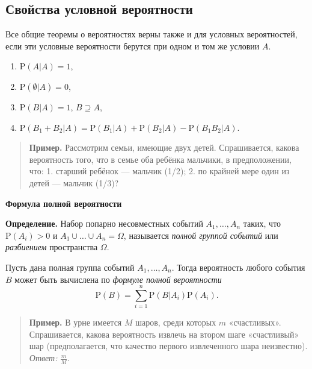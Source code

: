 \documentclass[11pt,a4paper]{article}
\providecommand{\tightlist}{%
      \setlength{\itemsep}{0pt}\setlength{\parskip}{0pt}}
\begin{document}
    \hypertarget{ux441ux432ux43eux439ux441ux442ux432ux430-ux443ux441ux43bux43eux432ux43dux43eux439-ux432ux435ux440ux43eux44fux442ux43dux43eux441ux442ux438}{%
\subsection{Свойства условной
вероятности}\label{ux441ux432ux43eux439ux441ux442ux432ux430-ux443ux441ux43bux43eux432ux43dux43eux439-ux432ux435ux440ux43eux44fux442ux43dux43eux441ux442ux438}}

Все общие теоремы о вероятностях верны также и для условных
вероятностей, если эти условные вероятности берутся при одном и том же
условии \(A\).

\begin{enumerate}
\def\labelenumi{\arabic{enumi}.}
\tightlist
\item
  \(\mathrm{P}(A|A) = 1\),
\item
  \(\mathrm{P}(\emptyset|A) = 0\),
\item
  \(\mathrm{P}(B|A) = 1\), \(B \supseteq A\),
\item
  \(\mathrm{P}(B_1 + B_2|A) = \mathrm{P}(B_1|A) + \mathrm{P}(B_2|A) - \mathrm{P}(B_1 B_2|A)\).
\end{enumerate}

\begin{quote}
\textbf{Пример.} Рассмотрим семьи, имеющие двух детей. Спрашивается,
какова вероятность того, что в семье оба ребёнка мальчики, в
предположении, что: 1. старший ребёнок --- мальчик (1/2); 2. по крайней
мере один из детей --- мальчик (1/3)?
\end{quote}

    \textbf{Формула полной вероятности}

\textbf{Определение.} Набор попарно несовместных событий
\(A_1, \ldots, A_n\) таких, что \(\mathrm{P}(A_i) > 0\) и
\(A_1 \cup \dots \cup A_n = \Omega\), называется \emph{полной группой
событий} или \emph{разбиением} пространства \(\Omega\).

Пусть дана полная группа событий \(A_1, \dots, A_n\). Тогда вероятность
любого события \(B\) может быть вычислена по \emph{формуле полной
вероятности}
\[ \mathrm{P}(B) = \sum_{i=1}^n \mathrm{P}(B|A_i) \mathrm{P}(A_i). \]

\begin{quote}
\textbf{Пример.} В урне имеется \(M\) шаров, среди которых \(m\)
«счастливых». Спрашивается, какова вероятность извлечь на втором шаге
«счастливый» шар (предполагается, что качество первого извлеченного шара
неизвестно).\\
\emph{Ответ:} \(\frac{m}{M}\).
\end{quote}
\end{document}
